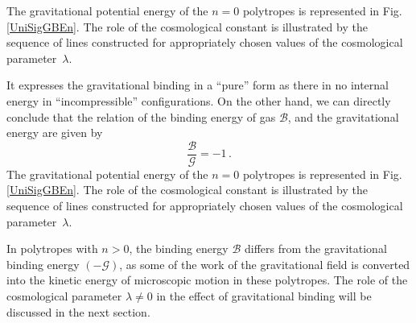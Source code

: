 The gravitational potential energy of the $n=0$ polytropes is represented in
Fig.\,\ref{UniSigGBEn}. The role of the cosmological constant is illustrated
by the sequence of lines constructed for appropriately chosen values of the
cosmological parameter~$\lambda$.

%
It expresses the gravitational binding in a ``pure'' form as there in no
internal energy in ``incompressible'' configurations. On the other hand, we
can directly conclude that the relation of the binding energy of gas
$\mathcal{B}$, and the gravitational energy are given by
\begin{equation}
  \frac{\mathcal{B}}{\mathcal{G}} = -1\,.              \label{Eq:grp122}
\end{equation}
The gravitational potential energy of the $n=0$ polytropes is represented in
Fig.\,\ref{UniSigGBEn}. The role of the cosmological constant is illustrated
by the sequence of lines constructed for appropriately chosen values of the
cosmological parameter~$\lambda$.

In polytropes with $n>0$, the binding energy $\mathcal{B}$ differs from the
gravitational binding energy $(-\mathcal{G})$, as some of the work of the
gravitational field is converted into the kinetic energy of microscopic motion
in these polytropes. The role of the cosmological parameter $\lambda \neq 0$
in the effect of gravitational binding will be discussed in the next section.

\endinput

